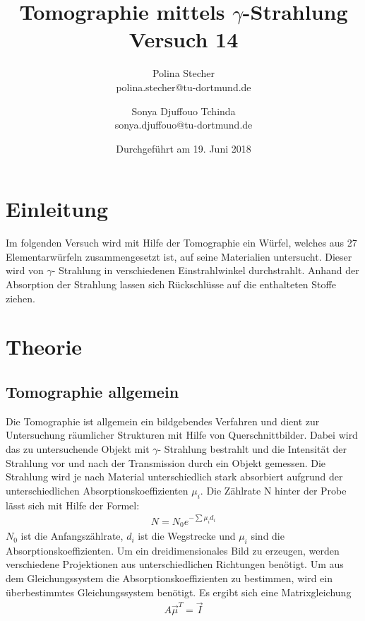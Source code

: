 \documentclass{article}
\begin{document}
	\scriptsize \normalsize
	\title{ Tomographie mittels $\gamma$-Strahlung  \\ Versuch 14}
	

	
	\author{Polina Stecher\\ {polina.stecher@tu-dortmund.de}  \and   Sonya Djuffouo Tchinda\\ {sonya.djuffouo@tu-dortmund.de}} %
	\date{Durchgeführt am  19. Juni  2018}
		\maketitle
	\newpage
	\tableofcontents
	\thispagestyle{empty}
	\newpage
	\newpage
	
\section{Einleitung }

Im folgenden Versuch wird mit Hilfe der Tomographie ein Würfel, welches aus 27 Elementarwürfeln zusammengesetzt ist, auf seine Materialien untersucht. Dieser wird von $\gamma$- Strahlung in verschiedenen Einstrahlwinkel durchstrahlt. Anhand der Absorption der Strahlung lassen sich Rückschlüsse auf die enthalteten Stoffe ziehen. 

\section{Theorie} 

\subsection{Tomographie allgemein}

Die Tomographie ist allgemein ein bildgebendes Verfahren und dient zur Untersuchung räumlicher Strukturen mit Hilfe von Querschnittbilder. Dabei wird das zu untersuchende Objekt mit $\gamma$- Strahlung bestrahlt und die Intensität der Strahlung vor und nach der Transmission durch ein Objekt gemessen. Die Strahlung wird je nach Material unterschiedlich stark absorbiert aufgrund der unterschiedlichen Absorptionskoeffizienten $\mu_i$. Die Zählrate N hinter der Probe lässt sich mit Hilfe der Formel:
\begin{align}
N=N_0 e^{-\sum \mu_i d_i}
\end{align}
$N_0$ ist die Anfangszählrate, $d_i$ ist die Wegstrecke und $\mu_i$ sind die Absorptionskoeffizienten. Um ein dreidimensionales Bild zu erzeugen, werden verschiedene Projektionen aus unterschiedlichen Richtungen benötigt. Um aus dem Gleichungssystem die Absorptionskoeffizienten zu bestimmen, wird ein überbestimmtes Gleichungssystem benötigt. Es ergibt sich eine Matrixgleichung
\begin{align}
A\vec{\mu}^T= \vec{I}
\end{align}
\end{document}
